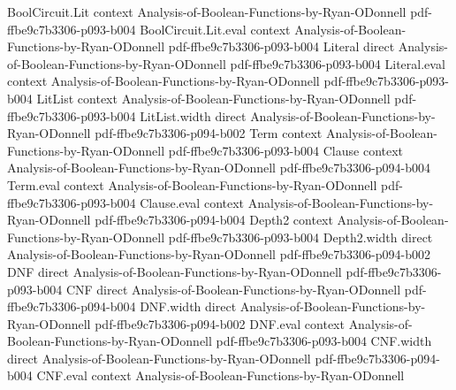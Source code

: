\begin{lemma}
\label{ArrowTheorem.corrFunc_ge_neg_third}
\leanok
{}
\proofstep
  {BoolCircuit.Lit}
  {context}
  {Analysis-of-Boolean-Functions-by-Ryan-ODonnell}
  {pdf-ffbe9c7b3306-p093-b004}
\proofstep
  {BoolCircuit.Lit.eval}
  {context}
  {Analysis-of-Boolean-Functions-by-Ryan-ODonnell}
  {pdf-ffbe9c7b3306-p093-b004}
\proofstep
  {Literal}
  {direct}
  {Analysis-of-Boolean-Functions-by-Ryan-ODonnell}
  {pdf-ffbe9c7b3306-p093-b004}
\proofstep
  {Literal.eval}
  {context}
  {Analysis-of-Boolean-Functions-by-Ryan-ODonnell}
  {pdf-ffbe9c7b3306-p093-b004}
\proofstep
  {LitList}
  {context}
  {Analysis-of-Boolean-Functions-by-Ryan-ODonnell}
  {pdf-ffbe9c7b3306-p093-b004}
\proofstep
  {LitList.width}
  {direct}
  {Analysis-of-Boolean-Functions-by-Ryan-ODonnell}
  {pdf-ffbe9c7b3306-p094-b002}
\proofstep
  {Term}
  {context}
  {Analysis-of-Boolean-Functions-by-Ryan-ODonnell}
  {pdf-ffbe9c7b3306-p093-b004}
\proofstep
  {Clause}
  {context}
  {Analysis-of-Boolean-Functions-by-Ryan-ODonnell}
  {pdf-ffbe9c7b3306-p094-b004}
\proofstep
  {Term.eval}
  {context}
  {Analysis-of-Boolean-Functions-by-Ryan-ODonnell}
  {pdf-ffbe9c7b3306-p093-b004}
\proofstep
  {Clause.eval}
  {context}
  {Analysis-of-Boolean-Functions-by-Ryan-ODonnell}
  {pdf-ffbe9c7b3306-p094-b004}
\proofstep
  {Depth2}
  {context}
  {Analysis-of-Boolean-Functions-by-Ryan-ODonnell}
  {pdf-ffbe9c7b3306-p093-b004}
\proofstep
  {Depth2.width}
  {direct}
  {Analysis-of-Boolean-Functions-by-Ryan-ODonnell}
  {pdf-ffbe9c7b3306-p094-b002}
\proofstep
  {DNF}
  {direct}
  {Analysis-of-Boolean-Functions-by-Ryan-ODonnell}
  {pdf-ffbe9c7b3306-p093-b004}
\proofstep
  {CNF}
  {direct}
  {Analysis-of-Boolean-Functions-by-Ryan-ODonnell}
  {pdf-ffbe9c7b3306-p094-b004}
\proofstep
  {DNF.width}
  {direct}
  {Analysis-of-Boolean-Functions-by-Ryan-ODonnell}
  {pdf-ffbe9c7b3306-p094-b002}
\proofstep
  {DNF.eval}
  {context}
  {Analysis-of-Boolean-Functions-by-Ryan-ODonnell}
  {pdf-ffbe9c7b3306-p093-b004}
\proofstep
  {CNF.width}
  {direct}
  {Analysis-of-Boolean-Functions-by-Ryan-ODonnell}
  {pdf-ffbe9c7b3306-p094-b004}
\proofstep
  {CNF.eval}
  {context}
  {Analysis-of-Boolean-Functions-by-Ryan-ODonnell}

\end{lemma}
